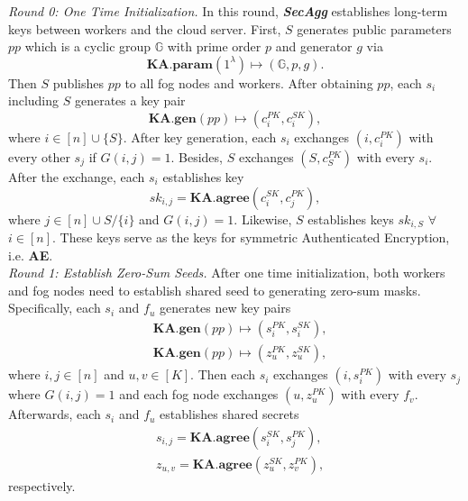 \documentclass[conference,a4paper]{IEEEtran}
\def\textbi#1{\textbf{\em #1}}
\begin{document}
    {\em Round 0: One Time Initialization.}
    In this round, \textbi{SecAgg} establishes long-term keys between workers and the cloud server. First, $S$ generates public parameters $pp$ which is a cyclic group $\mathbb{G}$ with prime order $p$ and generator $g$ via
    \begin{equation}\nonumber
        \textbf{KA.param}(1^\lambda)\mapsto (\mathbb{G},p,g).
    \end{equation}
    Then $S$ publishes $pp$ to all fog nodes and  workers. After obtaining $pp$, each $s_i$ including $S$ generates a key pair
    \begin{equation}\nonumber
      \textbf{KA.gen}(pp)\mapsto (c_i^{PK},c_i^{SK}),
    \end{equation}
    where $i\in [n]\cup \{S\}$. After key generation, each $s_i$ exchanges $(i,c_i^{PK})$ with every other $s_j$ if $G(i,j)=1$. Besides, $S$ exchanges $(S,c_S^{PK})$ with every $s_i$. After the exchange, each $s_i$ establishes key
    \begin{equation}\nonumber
      sk_{i,j}=\textbf{KA.agree}(c_i^{SK},c_j^{PK}),
    \end{equation}
    where $j\in [n]\cup {S}/\{i\}$ and $G(i,j)=1$. Likewise, $S$ establishes keys $sk_{i,S}$ $\forall$ $i\in [n]$. These keys serve as the keys for symmetric Authenticated Encryption, i.e. \textbf{AE}.\\

    {\em Round 1: Establish Zero-Sum Seeds.} After one time initialization, both workers and fog nodes need to establish shared seed to generating zero-sum masks. Specifically, each $s_i$ and $f_u$ generates new key pairs
    \begin{equation}\nonumber
    \begin{aligned}
      &\textbf{KA.gen}(pp)\mapsto (s_i^{PK},s_i^{SK}),\\
      &\textbf{KA.gen}(pp)\mapsto (z_u^{PK},z_u^{SK}),
    \end{aligned}
    \end{equation}
    where $i,j\in [n]$ and $u,v\in [K]$. Then each $s_i$ exchanges $(i,s_i^{PK})$ with every $s_j$ where $G(i,j)=1$ and each fog node exchanges $(u,z_u^{PK})$ with every $f_v$. Afterwards, each $s_i$ and $f_u$ establishes shared secrets
    \begin{equation}\nonumber
    \begin{aligned}
      &s_{i,j}=\textbf{KA.agree}(s_i^{SK},s_j^{PK}),\\
      &z_{u,v}=\textbf{KA.agree}(z_u^{SK},z_v^{PK}),
    \end{aligned}
    \end{equation}
    respectively.\\
\end{document}
